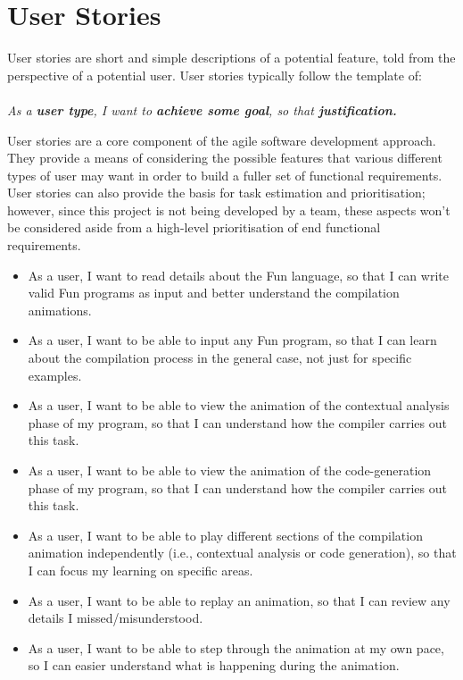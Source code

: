 \documentclass{l4proj}
\begin{document}
\section{User Stories}
User stories are short and simple descriptions of a potential feature, told from the perspective of a potential user. User stories typically follow the template of:\\\\
\textit{As a \textbf{user type}, I want to \textbf{achieve some goal}, so that \textbf{justification.}}

User stories are a core component of the agile software development approach. They provide a means of considering the possible features that various different types of user may want in order to build a fuller set of functional requirements. User stories can also provide the basis for task estimation and prioritisation; however, since this project is not being developed by a team, these aspects won't be considered aside from a high-level prioritisation of end functional requirements.

\begin{itemize}
\item As a user, I want to read details about the Fun language, so that I can write valid Fun programs as input and better understand the compilation animations.
\item As a user, I want to be able to input any Fun program, so that I can learn about the compilation process in the general case, not just for specific examples.
\item As a user, I want to be able to view the animation of the contextual analysis phase of my program, so that I can understand how the compiler carries out this task.
\item As a user, I want to be able to view the animation of the code-generation phase of my program, so that I can understand how the compiler carries out this task.
\item As a user, I want to be able to play different sections of the compilation animation independently (i.e., contextual analysis or code generation), so that I can focus my learning on specific areas. 
\item As a user, I want to be able to replay an animation, so that I can review any details I missed/misunderstood.
\item As a user, I want to be able to step through the animation at my own pace, so I can easier understand what is happening during the animation.
\end{itemize}
\end{document}
